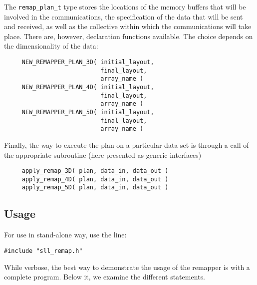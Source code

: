 \documentclass[]{report}   %
\begin{document}
The \verb+remap_plan_t+ type stores the locations of the memory buffers that will be involved in the communications, the specification of the data that will be sent and received, as well as the collective within which the communications will take place. There are, however, declaration functions available. The choice depends on the dimensionality of the data:

\begin{verbatim}
     NEW_REMAPPER_PLAN_3D( initial_layout, 
                           final_layout, 
                           array_name )
     NEW_REMAPPER_PLAN_4D( initial_layout, 
                           final_layout, 
                           array_name )
     NEW_REMAPPER_PLAN_5D( initial_layout, 
                           final_layout, 
                           array_name )
\end{verbatim}

Finally, the way to execute the plan on a particular data set is through a call of the appropriate subroutine (here presented as generic interfaces)

\begin{verbatim}
     apply_remap_3D( plan, data_in, data_out )
     apply_remap_4D( plan, data_in, data_out )
     apply_remap_5D( plan, data_in, data_out )
\end{verbatim}

\subsection{Usage}
For use in stand-alone way, use the line:
\begin{verbatim}
#include "sll_remap.h"
\end{verbatim}
While verbose, the best way to demonstrate the usage of the remapper is with a complete program. Below it, we examine the different statements.
\end{document}
